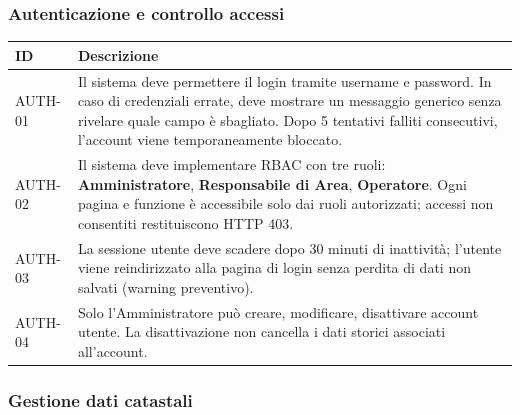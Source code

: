 \documentclass[12pt, a4paper]{article}
\begin{document}
\subsubsection{Autenticazione e controllo accessi}

\begin{longtable}{@{}p{2.5cm}p{9.5cm}@{}}
  \toprule
  \textbf{ID} & \textbf{Descrizione} \\
  \midrule
  \endhead

  AUTH-01 &
  Il sistema deve permettere il login tramite username e password. In caso di credenziali
  errate, deve mostrare un messaggio generico senza rivelare quale campo è sbagliato.
  Dopo 5 tentativi falliti consecutivi, l'account viene temporaneamente bloccato. \\[6pt]

  AUTH-02 &
  Il sistema deve implementare RBAC con tre ruoli: \textbf{Amministratore},
  \textbf{Responsabile di Area}, \textbf{Operatore}. Ogni pagina e funzione è accessibile
  solo dai ruoli autorizzati; accessi non consentiti restituiscono HTTP 403. \\[6pt]

  AUTH-03 &
  La sessione utente deve scadere dopo 30 minuti di inattività; l'utente viene reindirizzato
  alla pagina di login senza perdita di dati non salvati (warning preventivo). \\[6pt]

  AUTH-04 &
  Solo l'Amministratore può creare, modificare, disattivare account utente. La disattivazione
  non cancella i dati storici associati all'account. \\

  \bottomrule
\end{longtable}

\subsubsection{Gestione dati catastali}
\end{document}
